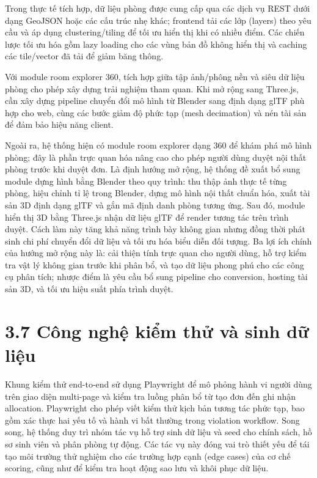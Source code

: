 Trong thực tế tích hợp, dữ liệu phòng được cung cấp qua các dịch vụ REST dưới dạng GeoJSON hoặc các cấu trúc nhẹ khác; frontend tải các lớp (layers) theo yêu cầu và áp dụng clustering/tiling để tối ưu hiển thị khi có nhiều điểm. Các chiến lược tối ưu hóa gồm lazy loading cho các vùng bản đồ không hiển thị và caching các tile/vector đã tải để giảm băng thông.

Với module room explorer 360, tích hợp giữa tập ảnh/phông nền và siêu dữ liệu phòng cho phép xây dựng trải nghiệm tham quan. Khi mở rộng sang Three.js, cần xây dựng pipeline chuyển đổi mô hình từ Blender sang định dạng glTF phù hợp cho web, cùng các bước giảm độ phức tạp (mesh decimation) và nén tài sản để đảm bảo hiệu năng client.

Ngoài ra, hệ thống hiện có module room explorer dạng 360 để khám phá mô hình phòng; đây là phần trực quan hóa nâng cao cho phép người dùng duyệt nội thất phòng trước khi duyệt đơn. Là định hướng mở rộng, hệ thống đề xuất bổ sung module dựng hình bằng Blender theo quy trình: thu thập ảnh thực tế từng phòng, hiệu chỉnh tỉ lệ trong Blender, dựng mô hình nội thất chuẩn hóa, xuất tài sản 3D định dạng glTF và gắn mã định danh phòng tương ứng. Sau đó, module hiển thị 3D bằng Three.js nhận dữ liệu glTF để render tương tác trên trình duyệt. Cách làm này tăng khả năng trình bày không gian nhưng đồng thời phát sinh chi phí chuyển đổi dữ liệu và tối ưu hóa biểu diễn đối tượng. Ba lợi ích chính của hướng mở rộng này là: cải thiện tính trực quan cho người dùng, hỗ trợ kiểm tra vật lý không gian trước khi phân bổ, và tạo dữ liệu phong phú cho các công cụ phân tích; nhược điểm là yêu cầu bổ sung pipeline cho conversion, hosting tài sản 3D, và tối ưu hiệu suất phía trình duyệt.

\section*{3.7 Công nghệ kiểm thử và sinh dữ liệu}

Khung kiểm thử end-to-end sử dụng Playwright để mô phỏng hành vi người dùng trên giao diện multi-page và kiểm tra luồng phân bổ từ tạo đơn đến ghi nhận allocation. Playwright cho phép viết kiểm thử kịch bản tương tác phức tạp, bao gồm xác thực hai yếu tố và hành vi bất thường trong violation workflow. Song song, hệ thống duy trì nhóm tác vụ hỗ trợ sinh dữ liệu và seed cho chính sách, hồ sơ sinh viên và phân phòng tự động. Các tác vụ này đóng vai trò thiết yếu để tái tạo môi trường thử nghiệm cho các trường hợp cạnh (edge cases) của cơ chế scoring, cũng như để kiểm tra hoạt động sao lưu và khôi phục dữ liệu.

